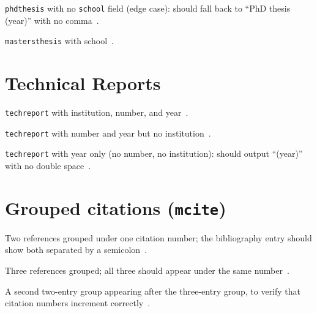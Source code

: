 \documentclass[12pt]{article}
\begin{document}
\texttt{phdthesis} with no \texttt{school} field (edge case): should fall back to ``PhD thesis (year)'' with no comma~\cite{phdthesis_noschool}.

\texttt{mastersthesis} with school~\cite{mastersthesis_example}.

\section{Technical Reports}

\texttt{techreport} with institution, number, and year~\cite{techreport_full}.

\texttt{techreport} with number and year but no institution~\cite{techreport_no_institution}.

\texttt{techreport} with year only (no number, no institution): should output ``(year)'' with no double space~\cite{techreport_year_only}.

\section{Grouped citations (\texttt{mcite})}

Two references grouped under one citation number; the bibliography entry should show both separated by a semicolon~\cite{mcite_a1, *mcite_a2}.

Three references grouped; all three should appear under the same number~\cite{mcite_b1, *mcite_b2, *mcite_b3}.

A second two-entry group appearing after the three-entry group, to verify that citation numbers increment correctly~\cite{mcite_c1, *mcite_c2}.


\end{document}
